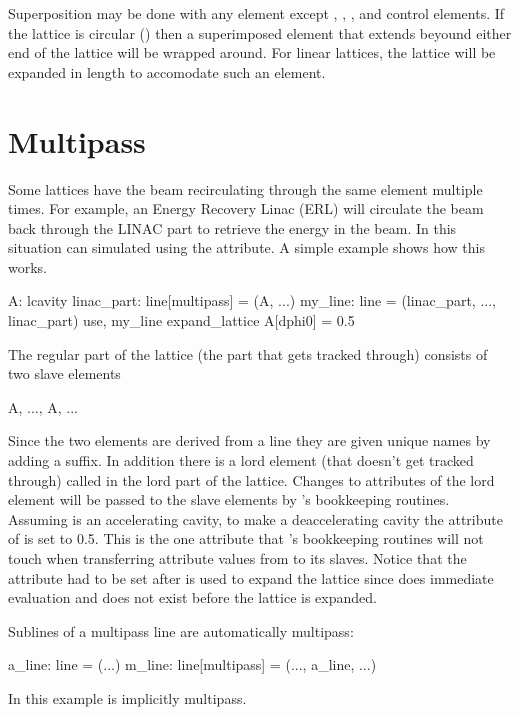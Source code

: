 Superposition may be done with any element except ,
, , and  control elements.  If the
lattice is circular () then a superimposed element that
extends beyound either end of the lattice will be wrapped around. For
linear lattices, the lattice will be expanded in length to accomodate
such an element.

\section{Multipass}
\label{s:multipass}

Some lattices have the beam recirculating through the same element
multiple times. For example, an Energy Recovery Linac (ERL) will
circulate the beam back through the LINAC part to retrieve the energy
in the beam. In \bmad this situation can simulated using the
 attribute. A simple example shows how this works.
\begin{example}
  A: lcavity
  linac_part: line[multipass] = (A, ...)
  my_line: line = (linac_part, ..., linac_part)
  use, my_line
  expand_lattice
  A[dphi0] = 0.5
\end{example}
The regular part of the lattice (the part that gets tracked through)
consists of two slave elements
\begin{example}
  A, ..., A, ...
\end{example}
Since the two elements are derived from a  line they are
given unique names by adding a  suffix. In addition there is
a lord element (that doesn't get tracked through) called  in the
lord part of the lattice. Changes to attributes of the lord 
element will be passed to the slave elements by \bmad's bookkeeping
routines. Assuming  is an accelerating cavity, to make
 a deaccelerating cavity the  attribute of
 is set to 0.5. This is the one attribute that \bmad's
bookkeeping routines will not touch when transferring attribute values
from  to its slaves. Notice that the  attribute had to
be set after  is used to expand the lattice since
\bmad does immediate evaluation and  does not exist before
the lattice is expanded.

Sublines of a multipass line are automatically multipass:
\begin{example}
  a_line: line = (...)
  m_line: line[multipass] = (..., a_line, ...)
\end{example}
In this example  is implicitly multipass.

